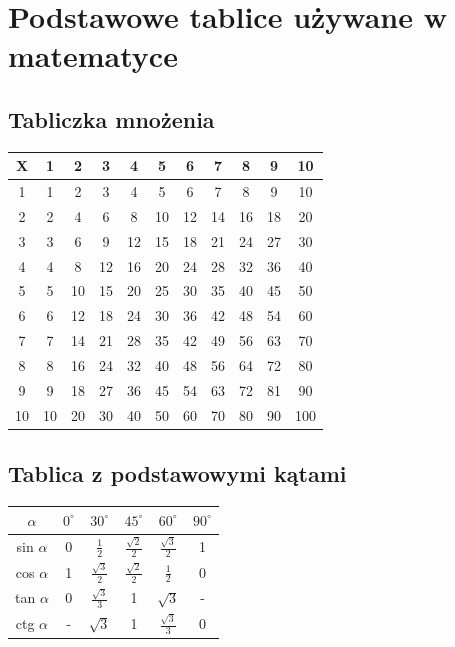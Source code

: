 \documentclass[a4paper]{article}
\begin{document}
\section{Podstawowe tablice używane w matematyce}
	

	\subsection{Tabliczka mnożenia}	

	\begin{tabular}{|c|c|c|c|c|c|c|c|c|c|c|}

 \hline 
	 X & 1 & 2 & 3 & 4 & 5 & 6 & 7 & 8 & 9 & 10 \\
 \hline 
 	1 & 1 & 2 & 3 & 4 & 5 & 6 & 7 & 8 & 9 & 10 \\
 \hline 
	2 & 2 & 4 & 6 & 8 & 10 & 12 & 14 & 16 & 18 & 20 \\
\hline 
 	3 & 3 & 6 & 9 & 12 & 15 & 18 & 21 & 24 & 27 & 30 \\
\hline 
 	4 & 4 & 8 & 12 & 16 & 20 & 24 & 28 & 32 & 36 & 40 \\
\hline 
 	5 & 5 & 10 & 15 & 20 & 25 & 30 & 35 & 40 & 45 & 50 \\
\hline 
 	6 & 6 & 12 & 18 & 24 & 30 & 36 & 42 & 48 & 54 & 60 \\
\hline 
 	7 & 7 & 14 & 21 & 28 & 35 & 42 & 49 & 56 & 63 & 70 \\
\hline 
 	8 & 8 & 16 & 24 & 32 & 40 & 48 & 56 & 64 & 72 & 80 \\
\hline 
 	9 & 9 & 18 & 27 & 36 & 45 & 54 & 63 & 72 & 81 & 90 \\
\hline 
 	10 & 10 & 20 & 30 & 40 & 50 & 60 & 70 & 80 & 90 & 100 \\
\hline 
\end{tabular} 
\label{tabmno}


	\subsection{Tablica z podstawowymi kątami}	
	\begin{tabular}{|c|c|c|c|c|c|}
 \hline 
	$\alpha$ & $0^{\circ}$ & $30^{\circ}$ & $45^{\circ}$ & $60^{\circ}$ & $90^{\circ}$  \\
 \hline 
 	sin $\alpha$ & 0 &  $\frac{1}{2}$ &  $\frac{\sqrt{2}}{2}$ & $\frac{\sqrt{3}}{2}$ & 1 \\
 \hline 
	cos $\alpha$ & 1 &  $\frac{\sqrt{3}}{2}$ &  $\frac{\sqrt{2}}{2}$ &  $\frac{1}{2}$  & 0  \\
\hline 
 	tan $\alpha$ & 0 &  $\frac{\sqrt{3}}{3}$ & 1 & $\sqrt{3}$ & -  \\
\hline 
 	ctg $\alpha$ & - & $\sqrt{3}$ & 1 &  $\frac{\sqrt{3}}{3}$ & 0  \\

\hline 
\end{tabular}
\label{tabkat}
\end{document}
